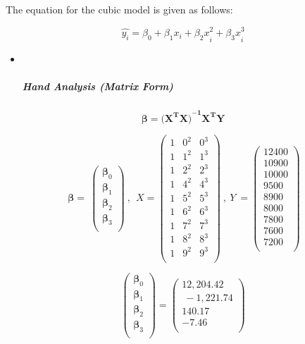 \documentclass[
]{article}
\begin{document}
The equation for the cubic model is given as follows:

\[\widehat{y_{i}} = \beta_{0} + \beta_{1}x_{i} + {\beta_{2}x}_{i}^{2} + {\beta_{3}x}_{i}^{3}\]

\begin{itemize}
\item ~
  \hypertarget{hand-analysis-matrix-form-5}{%
  \subparagraph{\texorpdfstring{\textbf{Hand Analysis (Matrix
  Form)}}{Hand Analysis (Matrix Form)}}\label{hand-analysis-matrix-form-5}}
\end{itemize}

\[\mathbf{\beta =}{\mathbf{(}\mathbf{X}^{\mathbf{T}}\mathbf{X)}}^{\mathbf{- 1}}\mathbf{X}^{\mathbf{T}}\mathbf{Y}\]

\[\ \mathbf{\beta =}\ \begin{pmatrix}
\mathbf{\beta}_{0} \\
\mathbf{\beta}_{1} \\
\mathbf{\beta}_{2} \\
\mathbf{\beta}_{3} \\
\end{pmatrix}\ ,\ \ X = \begin{pmatrix}
1 & 0^{2} & 0^{3} \\
1 & 1^{2} & 1^{3} \\
1 & 2^{2} & 2^{3} \\
1 & 4^{2} & 4^{3} \\
1 & 5^{2} & 5^{3} \\
1 & 6^{2} & 6^{3} \\
1 & 7^{2} & 7^{3} \\
1 & 8^{2} & 8^{3} \\
1 & 9^{2} & 9^{3} \\
\end{pmatrix}\ ,\ Y\  = \begin{pmatrix}
12400 \\
10900 \\
10000 \\
9500 \\
8900 \\
8000 \\
7800 \\
7600 \\
7200 \\
\end{pmatrix}\]

\[\begin{pmatrix}
\mathbf{\beta}_{0} \\
\mathbf{\beta}_{1} \\
\mathbf{\beta}_{2} \\
\mathbf{\beta}_{3} \\
\end{pmatrix} = \begin{pmatrix}
12,204.42 \\
\  - 1,221.74 \\
140.17 \\
 - 7.46 \\
\end{pmatrix}\]
\end{document}
